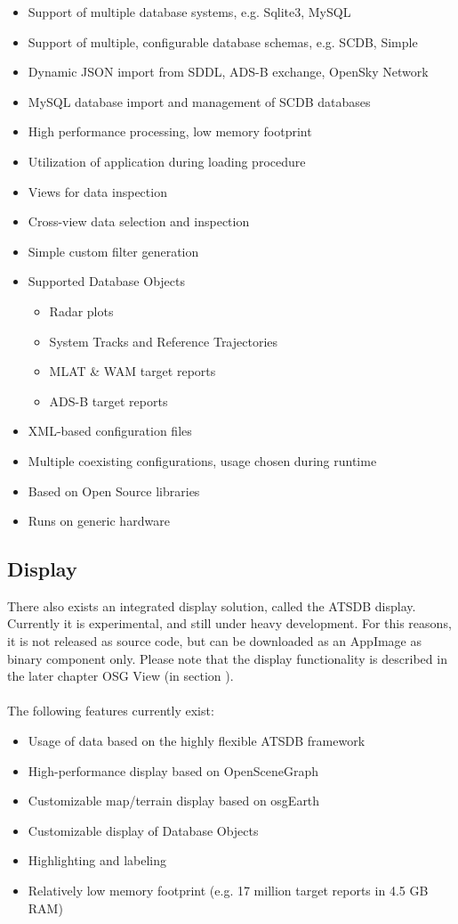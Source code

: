 \begin{itemize}  
\item Support of multiple database systems, e.g. Sqlite3, MySQL
\item Support of multiple, configurable database schemas, e.g. SCDB, Simple
\item Dynamic JSON import from SDDL, ADS-B exchange, OpenSky Network
\item MySQL database import and management of SCDB databases
\item High performance processing, low memory footprint
\item Utilization of application during loading procedure
\item Views for data inspection
\item Cross-view data selection and inspection
\item Simple custom filter generation
\item Supported Database Objects
\begin{itemize}  
\item Radar plots
\item System Tracks and Reference Trajectories
\item MLAT \& WAM target reports
\item ADS-B target reports
\end{itemize}
\item XML-based configuration files
\item Multiple coexisting configurations, usage chosen during runtime
\item Based on Open Source libraries
\item Runs on generic hardware
\end{itemize}

\subsection{Display}
There also exists an integrated display solution, called the ATSDB display. Currently it is experimental, and still under heavy development. For this reasons, it is not released as source code, but can be downloaded as an AppImage as binary component only. Please note that the display functionality is described in the later chapter OSG View (in section ).\\\\

The following features currently exist:

\begin{itemize}  
\item Usage of data based on the highly flexible ATSDB framework
\item High-performance display based on OpenSceneGraph
\item Customizable map/terrain display based on osgEarth
\item Customizable display of Database Objects
\item Highlighting and labeling
\item Relatively low memory footprint (e.g. 17 million target reports in 4.5 GB RAM)
\end{itemize}

